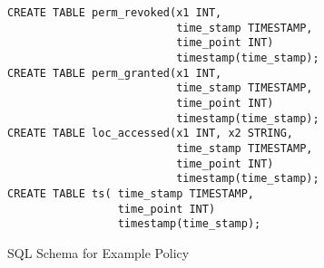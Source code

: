 \begin{figure}[H]
    \label{fig:example-policy-schema}
\begin{verbatim}
CREATE TABLE perm_revoked(x1 INT,
                          time_stamp TIMESTAMP,
                          time_point INT) 
                          timestamp(time_stamp);
CREATE TABLE perm_granted(x1 INT,
                          time_stamp TIMESTAMP,
                          time_point INT) 
                          timestamp(time_stamp);
CREATE TABLE loc_accessed(x1 INT, x2 STRING,
                          time_stamp TIMESTAMP,
                          time_point INT) 
                          timestamp(time_stamp);
CREATE TABLE ts( time_stamp TIMESTAMP,
                 time_point INT) 
                 timestamp(time_stamp);
\end{verbatim}
    \caption{SQL Schema for Example Policy}
\end{figure}


 


